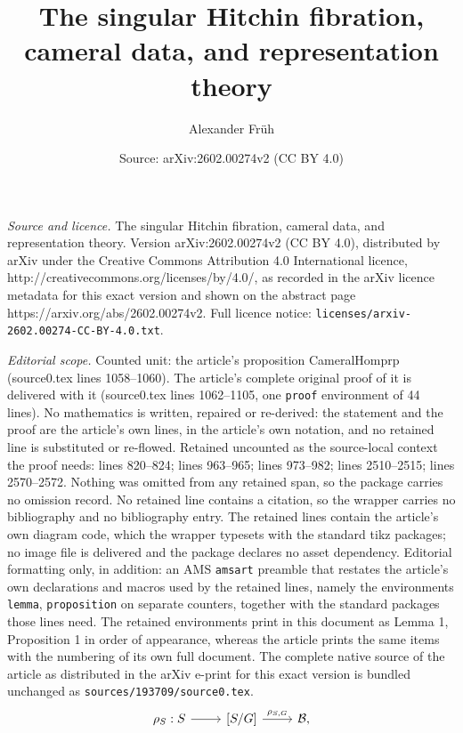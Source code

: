 \documentclass[10pt,a4paper]{amsart}
\title{The singular Hitchin fibration, cameral data, and representation theory}
\author{Alexander Fr\"{u}h}
\date{Source: arXiv:2602.00274v2 (CC BY 4.0)}
\begin{document}
\maketitle

\noindent\emph{Source and licence.} The singular Hitchin fibration, cameral data, and representation theory. Version arXiv:2602.00274v2 (CC BY 4.0), distributed by arXiv under the Creative Commons Attribution 4.0 International licence, http://creativecommons.org/licenses/by/4.0/, as recorded in the arXiv licence metadata for this exact version and shown on the abstract page https://arxiv.org/abs/2602.00274v2. Full licence notice: \texttt{licenses/arxiv-2602.00274-CC-BY-4.0.txt}.\par\smallskip

\noindent\textit{Editorial scope.} Counted unit: the article's proposition CameralHomprp (source0.tex lines 1058--1060). The article's complete original proof of it is delivered with it (source0.tex lines 1062--1105, one \texttt{proof} environment of 44 lines). No mathematics is written, repaired or re-derived: the statement and the proof are the article's own lines, in the article's own notation, and no retained line is substituted or re-flowed.  Retained uncounted as the source-local context the proof needs: lines 820--824; lines 963--965; lines 973--982; lines 2510--2515; lines 2570--2572.  Nothing was omitted from any retained span, so the package carries no omission record.  No retained line contains a citation, so the wrapper carries no bibliography and no bibliography entry.  The retained lines contain the article's own diagram code, which the wrapper typesets with the standard tikz packages; no image file is delivered and the package declares no asset dependency.  Editorial formatting only, in addition: an AMS \texttt{amsart} preamble that restates the article's own declarations and macros used by the retained lines, namely the environments \texttt{lemma}, \texttt{proposition} on separate counters, together with the standard packages those lines need.  The retained environments print in this document as Lemma 1, Proposition 1 in order of appearance, whereas the article prints the same items with the numbering of its own full document.  The complete native source of the article as distributed in the arXiv e-print for this exact version is bundled unchanged as \texttt{sources/193709/source0.tex}.
\begin{equation}\label{StackyChevalleyMapeqn}
\begin{tikzcd}
\rho_S:S \arrow[r] & {[S/G]} \arrow[r, "\rho_{S,G}"] & \mathcal B,
\end{tikzcd}
\end{equation}
\end{document}

